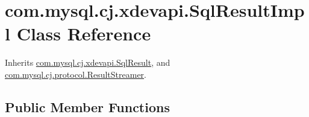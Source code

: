 \hypertarget{classcom_1_1mysql_1_1cj_1_1xdevapi_1_1_sql_result_impl}{}\section{com.\+mysql.\+cj.\+xdevapi.\+Sql\+Result\+Impl Class Reference}
\label{classcom_1_1mysql_1_1cj_1_1xdevapi_1_1_sql_result_impl}


Inherits \mbox{\hyperlink{interfacecom_1_1mysql_1_1cj_1_1xdevapi_1_1_sql_result}{com.\+mysql.\+cj.\+xdevapi.\+Sql\+Result}}, and \mbox{\hyperlink{interfacecom_1_1mysql_1_1cj_1_1protocol_1_1_result_streamer}{com.\+mysql.\+cj.\+protocol.\+Result\+Streamer}}.

\subsection*{Public Member Functions}
